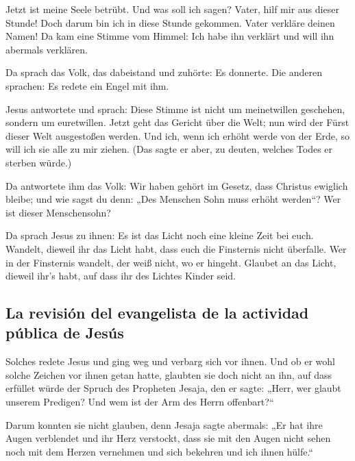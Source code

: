  Jetzt ist meine Seele betrübt. Und was soll ich sagen?
Vater, hilf mir aus dieser Stunde! Doch darum bin ich in diese Stunde
gekommen.  Vater verkläre deinen Namen! Da kam eine
Stimme vom Himmel: Ich habe ihn verklärt und will ihn abermals
verklären.

 Da sprach das Volk, das dabeistand und zuhörte: Es
donnerte. Die anderen sprachen: Es redete ein Engel mit ihm.

 Jesus antwortete und sprach: Diese Stimme ist nicht um
meinetwillen geschehen, sondern um euretwillen.  Jetzt
geht das Gericht über die Welt; nun wird der Fürst dieser Welt
ausgestoßen werden.  Und ich, wenn ich erhöht werde von
der Erde, so will ich sie alle zu mir ziehen.  (Das sagte
er aber, zu deuten, welches Todes er sterben würde.)

 Da antwortete ihm das Volk: Wir haben gehört im Gesetz,
dass Christus ewiglich bleibe; und wie sagst du denn: „Des Menschen Sohn
muss erhöht werden``? Wer ist dieser Menschensohn?

 Da sprach Jesus zu ihnen: Es ist das Licht noch eine
kleine Zeit bei euch. Wandelt, dieweil ihr das Licht habt, dass euch die
Finsternis nicht überfalle. Wer in der Finsternis wandelt, der weiß
nicht, wo er hingeht.  Glaubet an das Licht, dieweil
ihr's habt, auf dass ihr des Lichtes Kinder seid.

\hypertarget{la-revisiuxf3n-del-evangelista-de-la-actividad-puxfablica-de-jesuxfas}{%
\subsection{La revisión del evangelista de la actividad pública de
Jesús}\label{la-revisiuxf3n-del-evangelista-de-la-actividad-puxfablica-de-jesuxfas}}

 Solches redete Jesus und ging weg und verbarg sich vor
ihnen. Und ob er wohl solche Zeichen vor ihnen getan hatte, glaubten sie
doch nicht an ihn,  auf dass erfüllet würde der Spruch
des Propheten Jesaja, den er sagte: „Herr, wer glaubt unserem Predigen?
Und wem ist der Arm des Herrn offenbart?{}``

 Darum konnten sie nicht glauben, denn Jesaja sagte
abermals:  „Er hat ihre Augen verblendet und ihr Herz
verstockt, dass sie mit den Augen nicht sehen noch mit dem Herzen
vernehmen und sich bekehren und ich ihnen hülfe.``

